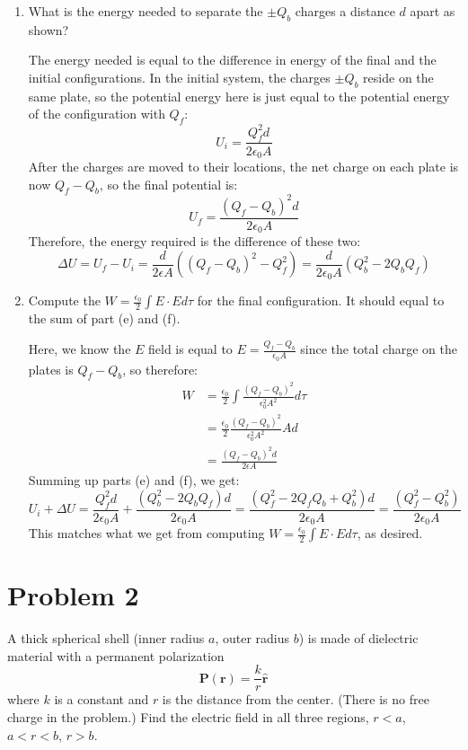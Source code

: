 \documentclass[10pt]{article}
\begin{document}
	\begin{enumerate}[label=\alph*),resume]
		\item What is the energy needed to separate the $\pm Q_b$ charges a distance $d$ apart as shown? 

			\begin{solution}
				The energy needed is equal to the difference in energy of the final and the initial 
				configurations. In the initial system, the charges $\pm Q_b$ reside on the same plate, so the 
				potential energy here is just equal to the potential energy of the configuration with $Q_f$: 
				\[
				U_i = \frac{Q_f^2d}{2 \epsilon_0 A}
				\] 
				After the charges are moved to their locations, the net charge on each plate is now $Q_f - Q_b$,
				so the final potential is: 
				\[
				U_f = \frac{(Q_f - Q_b)^2d}{2 \epsilon_0 A}
				\] 
				Therefore, the energy required is the difference of these two: 
				\[
				\Delta U = U_f - U_i = \frac{d}{2\epsilon A}((Q_f - Q_b)^2 - Q_f^2) = \frac{d}{2\epsilon_0A}
				(Q_b^2 - 2Q_bQ_f)
				\] 
			\end{solution}
		\item Compute the $W = \frac{\epsilon_0}{2}\int E \cdot E d\tau$ for the final configuration. It should
			equal to the sum of part (e) and (f). 

			\begin{solution}
				Here, we know the $E$ field is equal to $E = \frac{Q_f - Q_b}{\epsilon_0A}$ since the total 
				charge on the plates is $Q_f - Q_b$, so therefore: 
				\begin{align*}
					W &= \frac{\epsilon_0}{2} \int \frac{(Q_f - Q_b)^2}{\epsilon_0^2A^2}d\tau \\
					  &= \frac{\epsilon_0}{2} \frac{(Q_f - Q_b)^2}{\epsilon_0^2A^2} Ad \\
					  &= \frac{(Q_f - Q_b)^2d}{2\epsilon A}
				\end{align*}
				Summing up parts (e) and (f), we get: 
				\[
				U_i + \Delta U = \frac{Q_f^2d}{2\epsilon_0A} + \frac{(Q_b^2 - 2Q_b Q_f)d}{2\epsilon_0A} = 
				\frac{(Q_f^2 - 2Q_fQ_b + Q_b^2)d}{2\epsilon_0A} = \frac{(Q_f^2 - Q_b^2)}{2\epsilon_0A}
				\] 
				This matches what we get from computing $W = \frac{\epsilon_0}{2} \int E \cdot E d\tau$, as 
				desired. 
			\end{solution}
	\end{enumerate}
	
	\pagebreak
	\section*{Problem 2}
	A thick spherical shell (inner radius $a$, outer radius $b$) is made of dielectric material with a permanent
	polarization
	\[
		\mathbf{P(r)} = \frac{k}{r}\hat{\mathbf r}
	\] 
	where $k$ is a constant and $r$ is the distance from the center. (There is no free charge in the problem.)
	Find the electric field in all three regions, $r < a$, $a < r < b$, $r > b$. 
\end{document}
